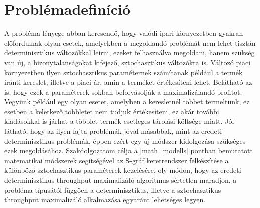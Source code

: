 \chapter{Problémadefiníció}
A probléma lényege abban keresendő, hogy valódi ipari környezetben gyakran előfordulnak olyan esetek, amelyekben a megoldandó problémát nem lehet tisztán determinisztikus változókkal leírni, ezeket felhasználva megoldani, hanem szükség van új, a bizonytalanságokat kifejező, sztochasztikus változókra is.
Változó piaci környezetben ilyen sztochasztikus paraméternek számítanak például a termék iránti kereslet, illetve a piaci ár, amin a terméket értékesíteni lehet.
Belátható az is, hogy ezek a paraméterek sokban befolyásolják a maximalizálandó profitot.
Vegyünk például egy olyan esetet, amelyben a keresletnél többet termeltünk, ez esetben a keletkező többletet nem tudjuk értékesíteni, ez akár további kiadásokkal is járhat a többlet termék esetleges tárolási költsége miatt.
Jól látható, hogy az ilyen fajta problémák jóval másabbak, mint az eredeti determinisztikus problémák, éppen ezért egy új módszer kidolgozása szükséges ezek megoldásához.
Szakdolgozatom célja a \ref{math_modells} pontban bemutatott matematikai módszerek segítségével az S-gráf keretrendszer felkészítése a különböző sztochasztikus paraméterek kezelésére, oly módon, hogy az eredeti determinisztikus throughput maximalizáló algoritmus sértetlen maradjon, a probléma típusától függően a determinisztikus, illetve a sztochasztikus throughput maximalizáló alkalmazása egyaránt lehetséges legyen.
